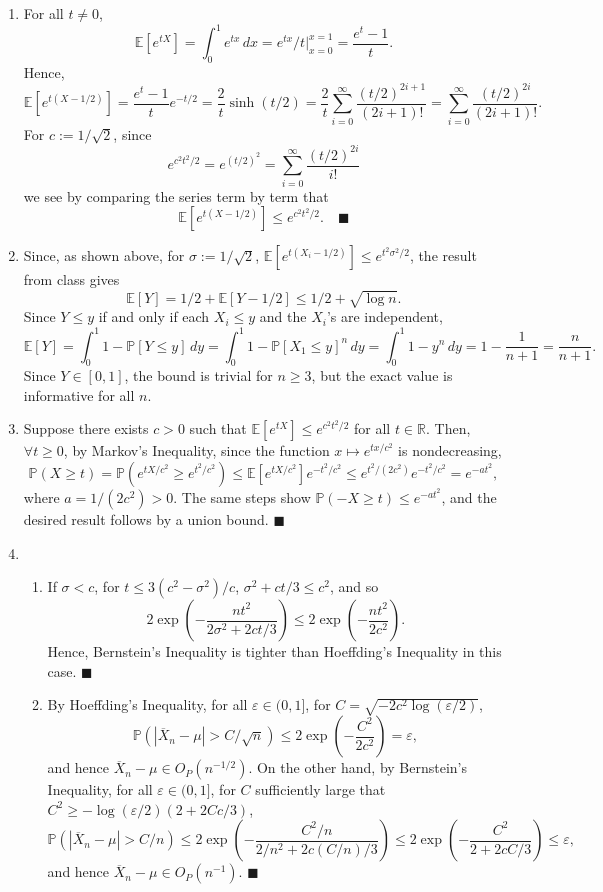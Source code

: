 \documentclass[11pt]{article}
\renewcommand{\qed}{\quad \ensuremath{\blacksquare}}
\newcommand{\E}{\mathbb{E}} %
\newcommand{\pr}{\mathbb{P}} %
\newcommand{\R}{\mathbb{R}} %
\newcommand{\e}{\varepsilon} %
\renewcommand{\P}{\mathbb{P}}   %
\begin{document}
\begin{enumerate}
\newpage
\item For all $t \neq 0$,
\[\E[e^{tX}]
    = \int_0^1 e^{tx} \, dx
    = e^{tx}/t \bigg|_{x = 0}^{x = 1}
    = \frac{e^t - 1}{t}.
\]
Hence,
\[\E[e^{t(X - 1/2)}]
    = \frac{e^t - 1}{t}e^{-t/2}
    = \frac{2}{t} \sinh(t/2)
    = \frac{2}{t} \sum_{i = 0}^\infty \frac{(t/2)^{2i + 1}}{(2i + 1)!}
    = \sum_{i = 0}^\infty \frac{(t/2)^{2i}}{(2i + 1)!}.
\]
For $c := 1/\sqrt2$, since
\[e^{c^2t^2/2}
    = e^{(t/2)^2}
    = \sum_{i = 0}^\infty \frac{(t/2)^{2i}}{i!}
\]
we see by comparing the series term by term that
\[\E[e^{t(X - 1/2)}] \leq e^{c^2t^2/2}. \qed\]
 
\item Since, as shown above, for $\sigma := 1/\sqrt2$,
$\E[e^{t(X_i - 1/2)}] \leq e^{t^2\sigma^2/2}$, the result from class gives
\[\E[Y]
    = 1/2 + \E[Y - 1/2]
    \leq 1/2 + \sqrt{\log n}.
\]
Since $Y \leq y$ if and only if each $X_i \leq y$ and the $X_i$'s are
independent,
\[\E[Y]
    = \int_0^1 1 - \pr[Y \leq y] \, dy
    = \int_0^1 1 - \pr[X_1 \leq y]^n \, dy
    = \int_0^1 1 - y^n \, dy
    = 1 - \frac{1}{n + 1}
    = \frac{n}{n + 1}.
\]
Since $Y \in [0,1]$, the bound is trivial for $n \geq 3$, but the exact
value is informative for all $n$.
 
\item Suppose there exists $c > 0$ such that $\E[e^{tX}] \leq e^{c^2t^2/2}$ for
all $t \in \R$. Then, $\forall t \geq 0$, by Markov's Inequality, since the
function $x \mapsto e^{tx/c^2}$ is nondecreasing,
\[\P(X \geq t)
    = \P(e^{tX/c^2} \geq e^{t^2/c^2})
    \leq \E[e^{tX/c^2}]e^{-t^2/c^2}
    \leq e^{t^2/(2c^2)}e^{-t^2/c^2}
    = e^{-at^2},
\]
where $a = 1/(2c^2) > 0$. The same steps show $\P(-X \geq t) \leq e^{-at^2}$,
and the desired result follows by a union bound. \qed
 
\item
\begin{enumerate}
\item If $\sigma < c$, for $t \leq 3(c^2 - \sigma^2)/c$,
$\sigma^2 + ct/3 \leq c^2$, and so
\[2\exp\left( -\frac{nt^2}{2\sigma^2 + 2ct/3} \right)
    \leq 2\exp\left( -\frac{nt^2}{2c^2} \right).
\]
Hence, Bernstein's Inequality is tighter than Hoeffding's Inequality in this
case. \qed

\item By Hoeffding's Inequality, for all $\e \in (0,1]$, for
$C = \sqrt{-2c^2 \log(\e/2)}$,
\[
\P\left( |\overline X_n - \mu| > C/\sqrt{n} \right)
    \leq 2\exp\left( -\frac{C^2}{2c^2} \right)
    = \e,
\]
and hence $\overline X_n - \mu \in O_P(n^{-1/2})$. On the other hand, by
Bernstein's Inequality, for all $\e \in (0,1]$, for $C$ sufficiently large that
$C^2 \geq -\log(\e/2)(2 + 2Cc/3)$,
\[
\P\left( |\overline X_n - \mu| > C/n \right)
    \leq 2\exp\left( -\frac{C^2/n}{2/n^2 + 2c(C/n)/3} \right) 
    \leq 2\exp\left( -\frac{C^2}{2 + 2cC/3} \right) 
    \leq \e,
\]
and hence $\overline X_n - \mu \in O_P(n^{-1})$. \qed
\end{enumerate}
 

\end{enumerate}
\end{document}
